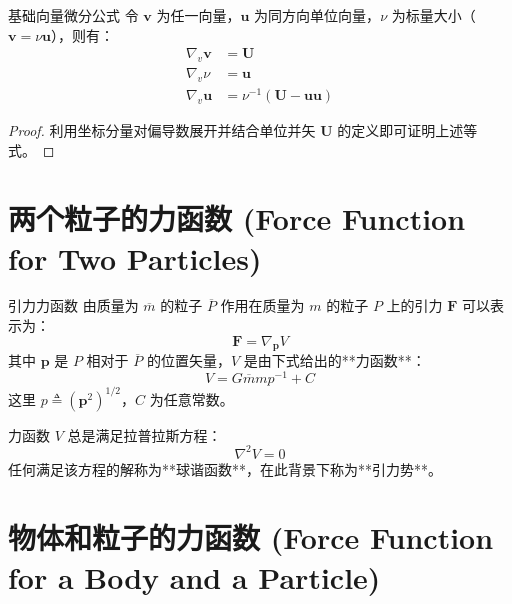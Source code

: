 \begin{myTheorem}{基础向量微分公式}
令 \(\mathbf{v}\) 为任一向量，\(\mathbf{u}\) 为同方向单位向量，\(\nu\) 为标量大小（\(\mathbf{v} = \nu\mathbf{u}\)），则有：
\begin{align}
\nabla_v \mathbf{v} &= \mathbf{U} \tag{7} \\
\nabla_v \nu &= \mathbf{u} \tag{8} \\
\nabla_v \mathbf{u} &= \nu^{-1}(\mathbf{U} - \mathbf{u}\mathbf{u}) \tag{9}
\end{align}
\end{myTheorem}
\begin{proof}
利用坐标分量对偏导数展开并结合单位并矢 \(\mathbf{U}\) 的定义即可证明上述等式。
\end{proof}

\section{两个粒子的力函数 (Force Function for Two Particles)}

\begin{mydefinition}{引力力函数}
由质量为 \(\overline{m}\) 的粒子 \(\overline{P}\) 作用在质量为 \(m\) 的粒子 \(P\) 上的引力 \(\mathbf{F}\) 可以表示为：
\begin{equation}
\mathbf{F} = \nabla_{\mathbf{p}} V \tag{1}
\end{equation}
其中 \(\mathbf{p}\) 是 \(P\) 相对于 \(\overline{P}\) 的位置矢量，\(V\) 是由下式给出的**力函数**：
\begin{equation}
V = G\overline{m}m p^{-1} + C \tag{2}
\end{equation}
这里 \(p \triangleq (\mathbf{p}^2)^{1/2}\)，\(C\) 为任意常数。
\end{mydefinition}

力函数 \(V\) 总是满足拉普拉斯方程：
\begin{equation}
\nabla^2 V = 0 \tag{4}
\end{equation}
任何满足该方程的解称为**球谐函数**，在此背景下称为**引力势**。

\section{物体和粒子的力函数 (Force Function for a Body and a Particle)}

